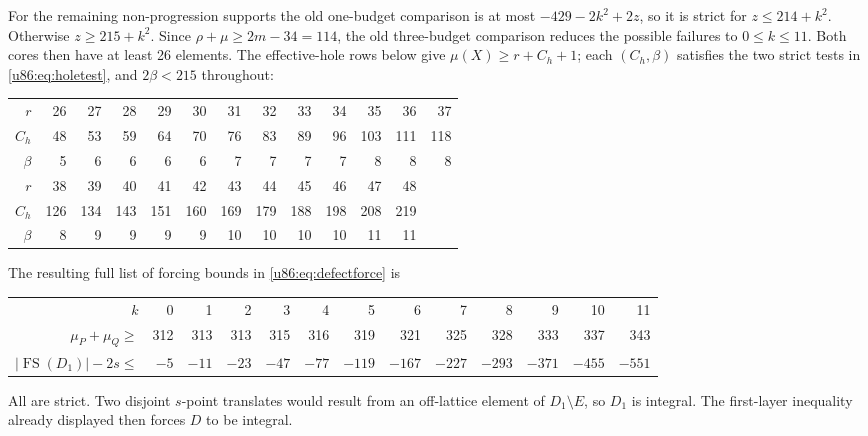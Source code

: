\documentclass[11pt,a4paper]{article}
\theoremstyle{remark}
\newcommand{\FS}{\operatorname{FS}}
\begin{document}
For the remaining non-progression supports the old one-budget comparison
is at most $-429-2k^2+2z$, so it is strict for $z\le214+k^2$.
Otherwise $z\ge215+k^2$. Since $\rho+\mu\ge2m-34=114$, the old
three-budget comparison reduces the possible failures to $0\le k\le11$.
Both cores then have at least 26 elements. The effective-hole rows below
give $\mu(X)\ge r+C_h+1$; each $(C_h,\beta)$ satisfies the two strict
tests in \eqref{u86:eq:holetest}, and $2\beta<215$ throughout:
\begin{center}\small
\begin{tabular}{r|rrrrrrrrrrrr}
\toprule
$r$&26&27&28&29&30&31&32&33&34&35&36&37\\
$C_h$&48&53&59&64&70&76&83&89&96&103&111&118\\
$\beta$&5&6&6&6&6&7&7&7&7&8&8&8\\\midrule
$r$&38&39&40&41&42&43&44&45&46&47&48&\\
$C_h$&126&134&143&151&160&169&179&188&198&208&219&\\
$\beta$&8&9&9&9&9&10&10&10&10&11&11&\\\bottomrule
\end{tabular}
\end{center}
The resulting full list of forcing bounds in \eqref{u86:eq:defectforce} is
\begin{center}\small\setlength{\tabcolsep}{4pt}
\begin{tabular}{r|rrrrrrrrrrrr}
\toprule
$k$&0&1&2&3&4&5&6&7&8&9&10&11\\
$\mu_P+\mu_Q\ge$&312&313&313&315&316&319&321&325&328&333&337&343\\
$|\FS(D_1)|-2s\le$&$-5$&$-11$&$-23$&$-47$&$-77$&$-119$&$-167$&$-227$&$-293$&$-371$&$-455$&$-551$\\\bottomrule
\end{tabular}
\end{center}
All are strict. Two disjoint $s$-point translates would result from an
off-lattice element of $D_1\setminus E$, so $D_1$ is integral. The
first-layer inequality already displayed then forces $D$ to be integral.
\end{document}
